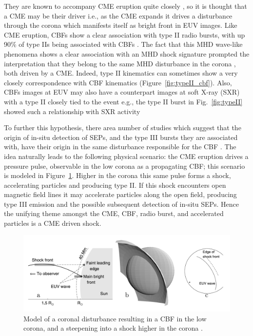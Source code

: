 They are known to accompany CME eruption quite closely \citep{bieseker2002}, so it is thought that a CME may be their driver i.e., as the CME expands it drives a disturbance through the corona which manifests itself as bright front in EUV images. Like CME eruption, CBFs show a clear association with type II radio bursts, with up 90\% of type IIs being associated with CBFs \citep{klassen2000}. The fact that this MHD wave-like phenomena shows a clear association with an MHD shock signature prompted the interpretation that they belong to the same MHD disturbance in the corona \citep{warmuth2004b}, both driven by a CME. Indeed, type II kinematics can sometimes show a very closely correspondence with CBF kinematics \citep{vrsna2005, grechnev2011} (Figure~\ref{fig:typeII_cbf}). Also, CBFs images at EUV may also have a counterpart images at soft X-ray (SXR) with a type II closely tied to the event e.g., the type II burst in Fig.~\ref{fig:typeII} showed such a relationship with SXR activity \citep{khan2002}


To further this hypothesis, there area number of studies which suggest that the origin of in-situ detection of SEPs, and the type III bursts they are associated with, have their origin in the same disturbance responsible for the CBF \citep{klassen2002, krucker1999, kozarev2011}. The idea naturally leads to the following physical scenario: the CME eruption drives a pressure pulse, observable in the low corona as a propagating CBF; this scenario is modeled in Figure~\ref{fig:shock_cbf}. Higher in the corona this same pulse forms a shock, accelerating particles and producing type II. If this shock encounters open magnetic field lines it may accelerate particles along the open field, producing type III emission and the possible subsequent detection of in-situ SEPs. Hence the unifying theme amongst the CME, CBF, radio burst, and accelerated particles is a CME driven shock.
\begin{figure}[!t]
\begin{center}
\includegraphics[scale=0.25, trim=1cm 0cm 0cm 2cm]{images/shock_sim}
\caption[Model of EUV wave and coronal shock]{Model of a coronal disturbance resulting in a CBF in the low corona, and a steepening into a shock higher in the corona \citep{grechnev2011a}.}
\label{fig:shock_cbf}
\end{center}
\end{figure}

